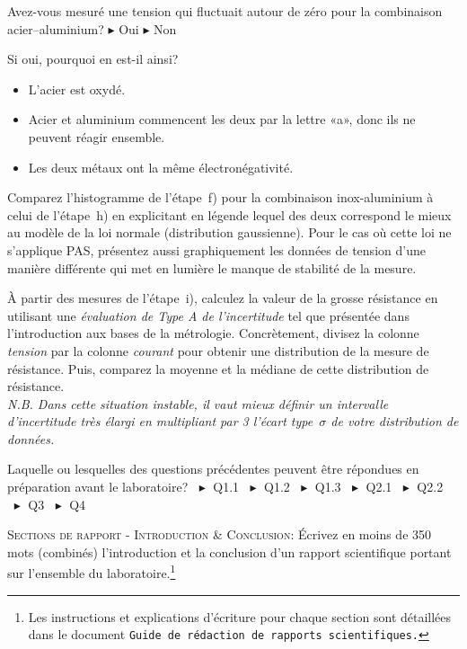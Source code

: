 \documentclass[canadien,12pt,oneside,letterpaper]{article}
\begin{document}
\begin{gradescope}
\begin{gradescope}
    \end{gradescope}
    \begin{gradescope}
    \item Avez-vous mesuré une tension qui fluctuait autour de zéro pour la combinaison acier--aluminium? $\blacktriangleright$ Oui $\blacktriangleright$ Non
    \item Si oui, pourquoi en est-il ainsi?
        \begin{itemize}[label=$\blacktriangleright$]
        \item L'acier est oxydé.
        \item Acier et aluminium commencent les deux par la lettre «a», donc ils ne peuvent réagir ensemble.
        \item Les deux métaux ont la même électronégativité.
        \end{itemize}
    \end{gradescope}
\item Comparez l’histogramme de l’étape~f) pour la combinaison inox-aluminium à celui de l’étape~h) en explicitant en légende lequel des deux correspond le mieux au modèle de la loi normale (distribution gaussienne). Pour le cas où cette loi ne s’applique PAS, présentez aussi graphiquement les données de tension d'une manière différente qui met en lumière le manque de stabilité de la mesure.
\item À partir des mesures de l'étape~i), calculez la valeur de la grosse résistance en utilisant une \textit{évaluation de Type A de l'incertitude} tel que présentée dans l’introduction aux bases de la métrologie. Concrètement, divisez la colonne \textit{tension} par la colonne \textit{courant} pour obtenir une distribution de la mesure de résistance. Puis, comparez la moyenne et la médiane de cette distribution de résistance.\\ \textit{N.B. Dans cette situation instable, il vaut mieux définir un intervalle d'incertitude très élargi en multipliant par 3 l'écart type~$\sigma$ de votre distribution de données.}
\item Laquelle ou lesquelles des questions précédentes peuvent être répondues en préparation avant le laboratoire? $\;\blacktriangleright$ Q1.1 $\;\blacktriangleright$ Q1.2 $\;\blacktriangleright$ Q1.3 $\;\blacktriangleright$ Q2.1 $\;\blacktriangleright$ Q2.2 $\;\blacktriangleright$ Q3 $\;\blacktriangleright$ Q4
\item \textsc{Sections de rapport - Introduction \& Conclusion:} Écrivez en moins de 350 mots (combinés) l'introduction et la conclusion d'un rapport scientifique portant sur l'ensemble du laboratoire.\footnote{Les instructions et explications d'écriture pour chaque section sont détaillées dans le document \texttt{Guide de rédaction de rapports scientifiques.}}
\end{gradescope}
\end{document}

